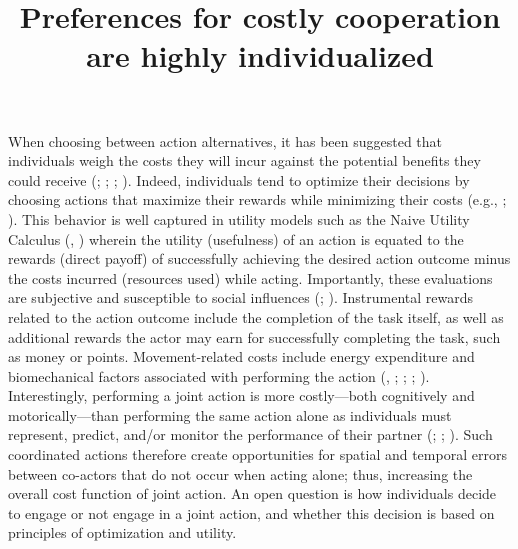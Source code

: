 \documentclass[
  man,
  floatsintext,
  longtable,
  nolmodern,
  notxfonts,
  notimes,
  mask,
  colorlinks=true,linkcolor=blue,citecolor=blue,urlcolor=blue]{apa7}
\title{Preferences for costly cooperation are highly individualized}
\begin{document}
\maketitle


\setcounter{secnumdepth}{-\maxdimen} %

\setlength\LTleft{0pt}

\resetlinenumber[1]

When choosing between action alternatives, it has been suggested that
individuals weigh the costs they will incur against the potential
benefits they could receive (; ;
;
). Indeed, individuals
tend to optimize their decisions by choosing actions that maximize their
rewards while minimizing their costs (e.g.,
;
). This behavior is well
captured in utility models such as the Naive Utility Calculus
(,
) wherein the utility (usefulness)
of an action is equated to the rewards (direct payoff) of successfully
achieving the desired action outcome minus the costs incurred (resources
used) while acting. Importantly, these evaluations are subjective and
susceptible to social influences (; ).
Instrumental rewards related to the action outcome include the
completion of the task itself, as well as additional rewards the actor
may earn for successfully completing the task, such as money or points.
Movement-related costs include energy expenditure and biomechanical
factors associated with performing the action
(, ;
;
;
). Interestingly, performing a
joint action is more costly---both cognitively and motorically---than
performing the same action alone as individuals must represent, predict,
and/or monitor the performance of their partner
(;
;
). Such coordinated
actions therefore create opportunities for spatial and temporal errors
between co-actors that do not occur when acting alone; thus, increasing
the overall cost function of joint action. An open question is how
individuals decide to engage or not engage in a joint action, and
whether this decision is based on principles of optimization and
utility.
\end{document}
